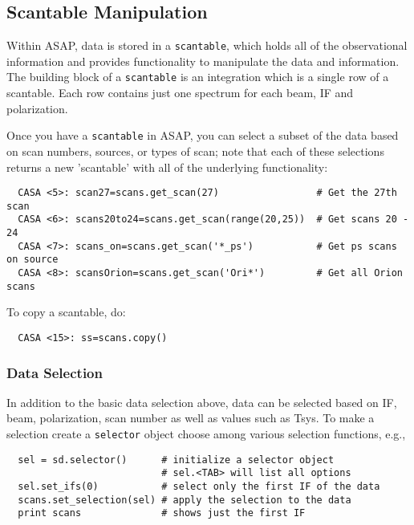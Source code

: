 \subsection{Scantable Manipulation}
\label{subsection:sd.asap.scantable}

Within ASAP, data is stored in a {\tt scantable}, which holds all of the
observational information and provides functionality to manipulate the
data and information. The building block of a {\tt scantable} is an
integration which is a single row of a scantable. Each row contains
just one spectrum for each beam, IF and polarization.  

Once you have a {\tt scantable} in ASAP, you can select a subset of the
data based on scan numbers, sources, or types of scan; note that each
of these selections returns a new 'scantable' with all of the 
underlying functionality: 

\small
\begin{verbatim}
  CASA <5>: scan27=scans.get_scan(27)                 # Get the 27th scan
  CASA <6>: scans20to24=scans.get_scan(range(20,25))  # Get scans 20 - 24
  CASA <7>: scans_on=scans.get_scan('*_ps')           # Get ps scans on source
  CASA <8>: scansOrion=scans.get_scan('Ori*')         # Get all Orion scans
\end{verbatim}
\normalsize

To copy a scantable, do:

\small
\begin{verbatim}
  CASA <15>: ss=scans.copy()
\end{verbatim}
\normalsize

\subsubsection{Data Selection}
\label{subsubsection:sd.asap.scantable.select}

In addition to the basic data selection above, data can be selected
based on IF, beam, polarization, scan number as well as values such as
Tsys.  To make a selection create a {\tt selector} object choose among various
selection functions, e.g., 

\small
\begin{verbatim}
  sel = sd.selector()      # initialize a selector object
                           # sel.<TAB> will list all options
  sel.set_ifs(0)           # select only the first IF of the data
  scans.set_selection(sel) # apply the selection to the data
  print scans              # shows just the first IF
\end{verbatim}
\normalsize

